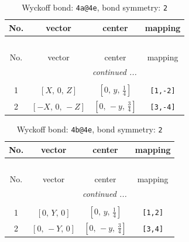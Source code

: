 \documentclass[fleqn,8pt]{jsarticle}
\begin{document}
\renewcommand{\arraystretch}{1.2}
\begin{longtable}{cccc}
\caption{Wyckoff bond: {\tt 4a@4e}, bond symmetry: {\tt 2}}
 \\
 \hline \hline
No. & vector & center & mapping \\ \hline \endfirsthead

\multicolumn{3}{l}{\tablename\ \thetable{}} \\
 \hline \hline
No. & vector & center & mapping \\ \hline \endhead

 \hline \hline
\multicolumn{3}{r}{\footnotesize\it continued ...} \\ \endfoot

 \hline \hline
\multicolumn{3}{r}{} \\ \endlastfoot

1 & $\left[ X,\, 0,\, Z \right]$ & $\left[ 0,\, y,\, \frac{1}{4} \right]$ & {\tt [1,-2]} \\ \hline
2 & $\left[ - X,\, 0,\, - Z \right]$ & $\left[ 0,\, - y,\, \frac{3}{4} \right]$ & {\tt [3,-4]} \\
\end{longtable}
\renewcommand{\arraystretch}{1.2}
\begin{longtable}{cccc}
\caption{Wyckoff bond: {\tt 4b@4e}, bond symmetry: {\tt 2}}
 \\
 \hline \hline
No. & vector & center & mapping \\ \hline \endfirsthead

\multicolumn{3}{l}{\tablename\ \thetable{}} \\
 \hline \hline
No. & vector & center & mapping \\ \hline \endhead

 \hline \hline
\multicolumn{3}{r}{\footnotesize\it continued ...} \\ \endfoot

 \hline \hline
\multicolumn{3}{r}{} \\ \endlastfoot

1 & $\left[ 0,\, Y,\, 0 \right]$ & $\left[ 0,\, y,\, \frac{1}{4} \right]$ & {\tt [1,2]} \\ \hline
2 & $\left[ 0,\, - Y,\, 0 \right]$ & $\left[ 0,\, - y,\, \frac{3}{4} \right]$ & {\tt [3,4]} \\
\end{longtable}
\renewcommand{\arraystretch}{1.2}
\end{document}
